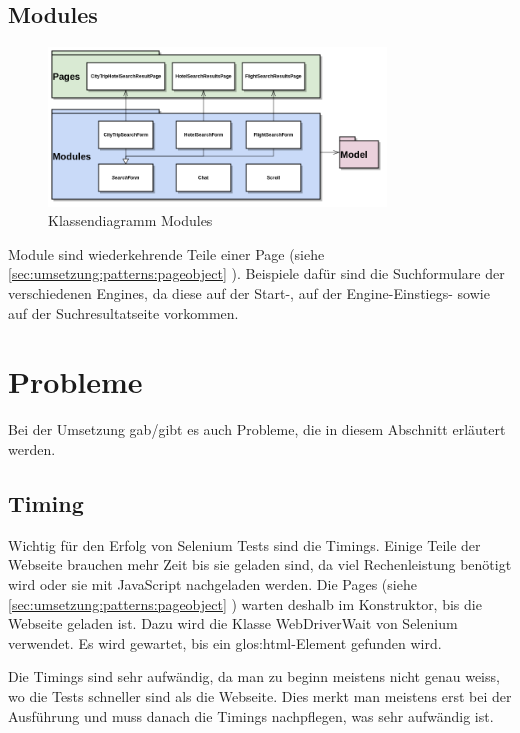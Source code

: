 \subsection{Modules}
\begin{figure}[H]
	\centering
	\includegraphics[width=0.8\textwidth]{images/semesterarbeit class diagram - modules.png}
	\caption{Klassendiagramm Modules}
	\label{fig:umsetzung:architektur:modules}
\end{figure}
Module sind wiederkehrende Teile einer Page (siehe \cref{sec:umsetzung:patterns:pageobject} ). Beispiele dafür sind die Suchformulare der verschiedenen Engines, da diese auf der Start-, auf der Engine-Einstiegs- sowie auf der Suchresultatseite vorkommen.

\section{Probleme}
Bei der Umsetzung gab/gibt es auch Probleme, die in diesem Abschnitt erläutert werden.

\subsection{Timing}
\label{sec:umsetzung:probleme:timing}
Wichtig für den Erfolg von Selenium Tests sind die Timings. Einige Teile der Webseite brauchen mehr Zeit bis sie geladen sind, da viel Rechenleistung benötigt wird oder sie mit JavaScript nachgeladen werden. Die Pages (siehe \cref{sec:umsetzung:patterns:pageobject} ) warten deshalb im Konstruktor, bis die Webseite geladen ist. Dazu wird die Klasse WebDriverWait von Selenium verwendet. Es wird gewartet, bis ein \Gls{glos:html}-Element gefunden wird.

Die Timings sind sehr aufwändig, da man zu beginn meistens nicht genau weiss, wo die Tests schneller sind als die Webseite. Dies merkt man meistens erst bei der Ausführung und muss danach die Timings nachpflegen, was sehr aufwändig ist.

